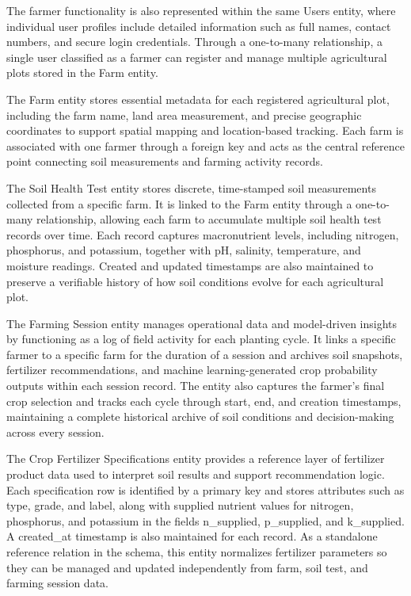 {	The farmer functionality is also represented within the same Users entity, where individual user profiles include detailed information such as full names, contact numbers, and secure login credentials. Through a one-to-many relationship, a single user classified as a farmer can register and manage multiple agricultural plots stored in the Farm entity.
	
	The Farm entity stores essential metadata for each registered agricultural plot, including the farm name, land area measurement, and precise geographic coordinates to support spatial mapping and location-based tracking. Each farm is associated with one farmer through a foreign key and acts as the central reference point connecting soil measurements and farming activity records.
	
	The Soil Health Test entity stores discrete, time-stamped soil measurements collected from a specific farm. It is linked to the Farm entity through a one-to-many relationship, allowing each farm to accumulate multiple soil health test records over time. Each record captures macronutrient levels, including nitrogen, phosphorus, and potassium, together with pH, salinity, temperature, and moisture readings. Created and updated timestamps are also maintained to preserve a verifiable history of how soil conditions evolve for each agricultural plot.
	
	The Farming Session entity manages operational data and model-driven insights by functioning as a log of field activity for each planting cycle. It links a specific farmer to a specific farm for the duration of a session and archives soil snapshots, fertilizer recommendations, and machine learning-generated crop probability outputs within each session record. The entity also captures the farmer’s final crop selection and tracks each cycle through start, end, and creation timestamps, maintaining a complete historical archive of soil conditions and decision-making across every session.
	
	The Crop Fertilizer Specifications entity provides a reference layer of fertilizer product data used to interpret soil results and support recommendation logic. Each specification row is identified by a primary key and stores attributes such as type, grade, and label, along with supplied nutrient values for nitrogen, phosphorus, and potassium in the fields n\_supplied, p\_supplied, and k\_supplied. A created\_at timestamp is also maintained for each record. As a standalone reference relation in the schema, this entity normalizes fertilizer parameters so they can be managed and updated independently from farm, soil test, and farming session data.
	
}
